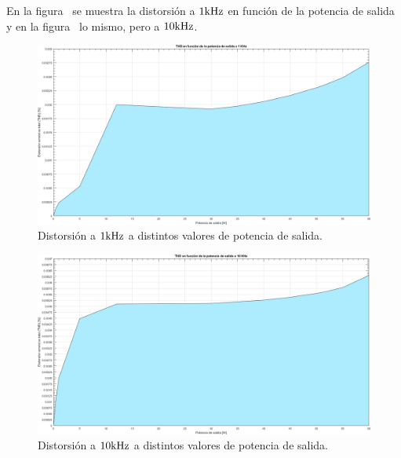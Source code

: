 En la figura~ se muestra la distorsión a $1 \si[per-mode=symbol]{\kilo\hertz}$ en función de la potencia de salida y en la figura~ lo mismo, pero a $10 \si[per-mode=symbol]{\kilo\hertz}$.

\clearpage


\begin{figure}[H]
	\centering
	\includegraphics[width=0.7\paperheight, angle=90]{img/sims/distorsion-barrido-1.png}
	\caption{Distorsión a $1 \si[per-mode=symbol]{\kilo\hertz}$ a distintos valores de potencia de salida.}
	\label{fig:distorsion-barrido-1}
\end{figure}

\clearpage


\begin{figure}[H]
	\centering
	\includegraphics[width=0.7\paperheight, angle=90]{img/sims/distorsion-barrido-2.png}
	\caption{Distorsión a $10 \si[per-mode=symbol]{\kilo\hertz}$ a distintos valores de potencia de salida.}
	\label{fig:distorsion-barrido-2}
\end{figure}

\clearpage

